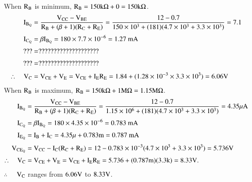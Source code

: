 \begin{solution}
When $\textrm{R}_{\textrm{B}}$ is minimum, $\textrm{R}_{\textrm{B}}=150\textrm{k}\Omega+0=150\textrm{k}\Omega$.
\begin{align*}
\textrm{I}_{\textrm{B}_{\textrm{Q}}} &= \frac{\textrm{V}_{\text{CC}}-\textrm{V}_{\text{BE}}}{\textrm{R}_{\textrm{B}}+(\beta+1)(\textrm{R}_{\textrm{C}}+\textrm{R}_{\textrm{E}})}=\dfrac{12-0.7}{150\times 10^{3}+(181)(4.7\times 10^{3}+3.3\times 10^{3})}=7.1\\[3pt]
\textrm{I}_{\textrm{C}_{\textrm{Q}}} &= \beta \textrm{I}_{\textrm{B}_{\textrm{Q}}}=180\times 7.7\times 10^{-6}=1.27\text{~mA}\\[3pt]
??? &= ????????????????????\\[3pt]
??? &= ????????????????????\\[3pt]
\therefore\quad \textrm{V}_{\textrm{C}} &= \textrm{V}_{\text{CE}} +\textrm{V}_{\textrm{E}}=\textrm{V}_{\text{CE}}+\textrm{I}_{\textrm{E}}\textrm{R}_{\textrm{E}}=1.84+(1.28\times 10^{-3}\times 3.3\times 10^{3})=6.06\textrm{V}
\end{align*}
When $\textrm{R}_{\textrm{B}}$ is maximum, $\textrm{R}_{\textrm{B}}=150\textrm{k}\Omega+1\textrm{M}\Omega=1.15\textrm{M}\Omega$.
\begin{align*}
\textrm{I}_{\textrm{B}_{\textrm{Q}}} &= \frac{\textrm{V}_{\text{CC}}-\textrm{V}_{\text{BE}}}{\textrm{R}_{\textrm{B}}+(\beta+1)(\textrm{R}_{\textrm{C}}+\textrm{R}_{\textrm{E}})}=\frac{12-0.7}{1.15\times 10^{6}+(181)(4.7\times 10^{3}+3.3\times 10^{3})}=4.35\mu\textrm{A}\\[3pt]
\textrm{I}_{\textrm{C}_{\textrm{Q}}} &= \beta \textrm{I}_{\textrm{B}_{\textrm{Q}}} = 180\times 4.35\times 10^{-6}=0.783\text{~mA}\\[3pt]
\textrm{I}_{\textrm{E}_{\textrm{Q}}} &= \textrm{I}_{\textrm{B}}+\textrm{I}_{\textrm{C}}=4.35\mu+0.783\textrm{m}=0.787\text{~mA}\\[3pt]
\textrm{V}_{\text{CE}_{\textrm{Q}}} &= \textrm{V}_{\text{CC}}-\textrm{I}_{\textrm{C}}(\textrm{R}_{\textrm{C}}+\textrm{R}_{\textrm{E}})=12-0.783\times 10^{-3}(4.7\times 10^{3}+3.3\times 10^{3})=5.736\textrm{V}\\[3pt]
\therefore\quad \textrm{V}_{\textrm{C}} &= \textrm{V}_{\text{CE}}+\textrm{V}_{\textrm{E}}=\textrm{V}_{\text{CE}}+\textrm{I}_{\textrm{E}}\textrm{R}_{\textrm{E}}=5.736+(0.787\textrm{m})(3.3\textrm{k})=8.33\textrm{V}.
\end{align*}
$\therefore$~~ $\textrm{V}_{\textrm{C}}$ ranges from $6.06\textrm{V}$ to $8.33\textrm{V}$.
\end{solution}


